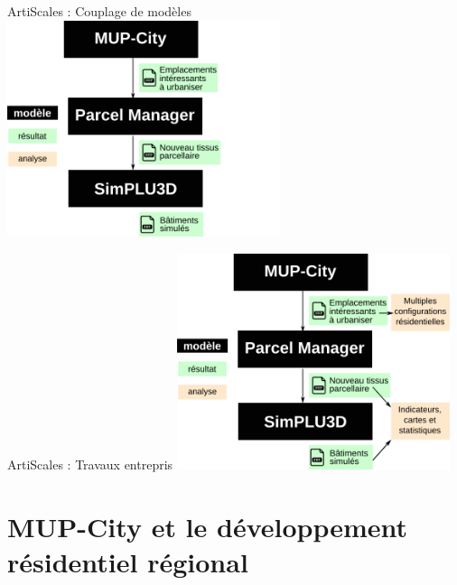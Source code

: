 \documentclass[xcolor=table]{beamer}
\begin{document}
\begin{frame}{ArtiScales : Couplage de modèles}
	\centering
	\includegraphics[width=8cm]{Images/schemGenPrez0.png}
\end{frame}


\begin{frame}{ArtiScales : Travaux entrepris}
	\centering
	\includegraphics[width=8cm]{Images/schemGenPrez1.png}
\end{frame}


\section[MUP-City]{MUP-City et le développement résidentiel régional}
\end{document}

